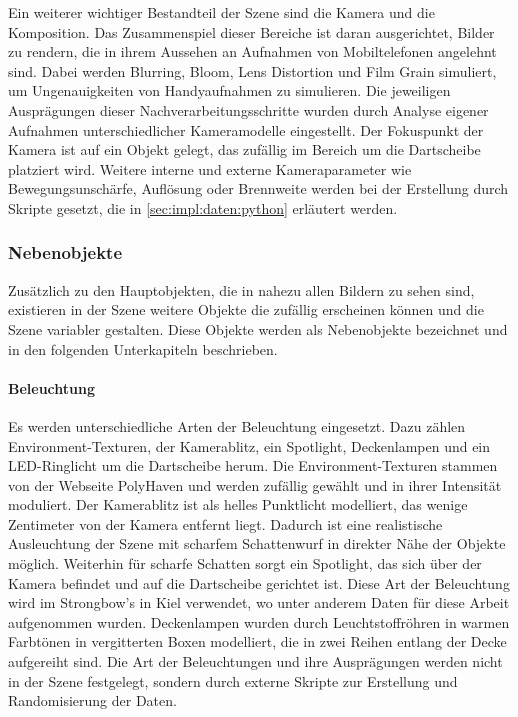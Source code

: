 Ein weiterer wichtiger Bestandteil der Szene sind die Kamera und die Komposition. Das Zusammenspiel dieser Bereiche ist daran ausgerichtet, Bilder zu rendern, die in ihrem Aussehen an Aufnahmen von Mobiltelefonen angelehnt sind. Dabei werden Blurring, Bloom, Lens Distortion und Film Grain simuliert, um Ungenauigkeiten von Handyaufnahmen zu simulieren. Die jeweiligen Ausprägungen dieser Nachverarbeitungsschritte wurden durch Analyse eigener Aufnahmen unterschiedlicher Kameramodelle eingestellt. Der Fokuspunkt der Kamera ist auf ein Objekt gelegt, das zufällig im Bereich um die Dartscheibe platziert wird. Weitere interne und externe Kameraparameter wie Bewegungsunschärfe, Auflösung oder Brennweite werden bei der Erstellung durch Skripte gesetzt, die in \autoref{sec:impl:daten:python} erläutert werden.

\subsubsection{Nebenobjekte}
\label{sec:impl:daten:blender:nebenobjekte}

Zusätzlich zu den Hauptobjekten, die in nahezu allen Bildern zu sehen sind, existieren in der Szene weitere Objekte die zufällig erscheinen können und die Szene variabler gestalten. Diese Objekte werden als Nebenobjekte bezeichnet und in den folgenden Unterkapiteln beschrieben.

\paragraph{Beleuchtung}
\label{sec:impl:daten:blender:nebenobjekte:licht}

Es werden unterschiedliche Arten der Beleuchtung eingesetzt. Dazu zählen Environment-Texturen, der Kamerablitz, ein Spotlight, Deckenlampen und ein LED-Ringlicht um die Dartscheibe herum. Die Environment-Texturen stammen von der Webseite PolyHaven\cite{polyhaven} und werden zufällig gewählt und in ihrer Intensität moduliert. Der Kamerablitz ist als helles Punktlicht modelliert, das wenige Zentimeter von der Kamera entfernt liegt. Dadurch ist eine realistische Ausleuchtung der Szene mit scharfem Schattenwurf in direkter Nähe der Objekte möglich. Weiterhin für scharfe Schatten sorgt ein Spotlight, das sich über der Kamera befindet und auf die Dartscheibe gerichtet ist. Diese Art der Beleuchtung wird im Strongbow's in Kiel verwendet, wo unter anderem Daten für diese Arbeit aufgenommen wurden. Deckenlampen wurden durch Leuchtstoffröhren in warmen Farbtönen in vergitterten Boxen modelliert, die in zwei Reihen entlang der Decke aufgereiht sind. Die Art der Beleuchtungen und ihre Ausprägungen werden nicht in der Szene festgelegt, sondern durch externe Skripte zur Erstellung und Randomisierung der Daten.

